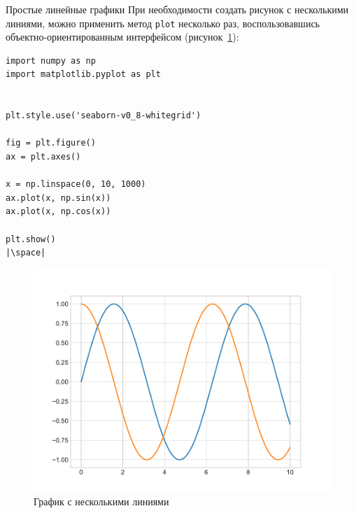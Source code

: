 \documentclass[aspectratio=169, mathserif]{beamer}	%
\begin{document}
\begin{frame}[fragile, label=m]{Простые линейные графики}
\scriptsize
При необходимости создать рисунок с несколькими линиями, можно применить метод \texttt{plot} несколько раз, воспользовавшись объектно-ориентированным интерфейсом (рисунок~\ref{fig:fig_5}):
\vfill
\begin{minipage}{.4\textwidth}
\begin{verbatim}
import numpy as np
import matplotlib.pyplot as plt


plt.style.use('seaborn-v0_8-whitegrid')

fig = plt.figure()
ax = plt.axes()

x = np.linspace(0, 10, 1000)
ax.plot(x, np.sin(x))
ax.plot(x, np.cos(x))

plt.show()
|\space|
\end{verbatim}
\end{minipage}
\begin{minipage}{.59\textwidth}
\begin{figure}[h!]
	\centering
	\includegraphics[width=\linewidth]{./pics/Figure_5.pdf}
	\caption{График с несколькими линиями}
	\label{fig:fig_5}
\end{figure}
\end{minipage}
\vfill
\end{frame}
\end{document}
